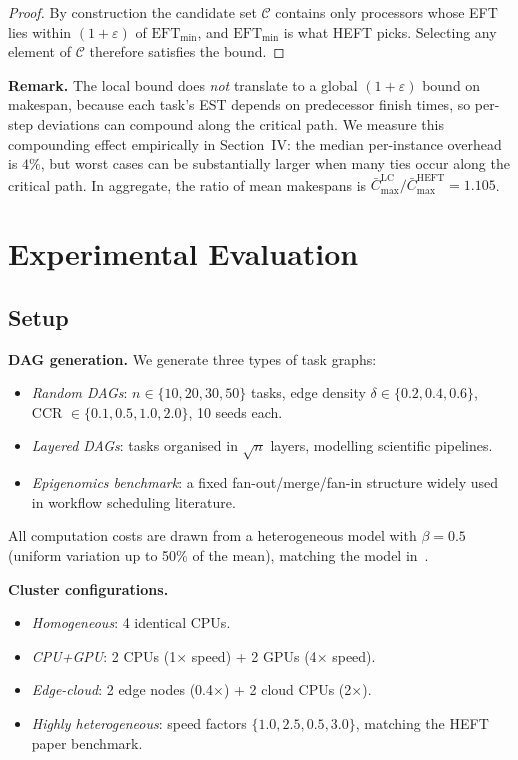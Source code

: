 \documentclass[conference]{IEEEtran}
\begin{document}
\begin{proof}
By construction the candidate set $\mathcal{C}$ contains only processors
whose EFT lies within $(1+\varepsilon)$ of $\text{EFT}_{\min}$, and
$\text{EFT}_{\min}$ is what HEFT picks. Selecting any element of
$\mathcal{C}$ therefore satisfies the bound.
\end{proof}

\textbf{Remark.} The local bound does \emph{not} translate to a global
$(1+\varepsilon)$ bound on makespan, because each task's EST depends on
predecessor finish times, so per-step deviations can compound along the
critical path. We measure this compounding effect empirically in
Section~IV: the median per-instance overhead is $4\%$, but worst
cases can be substantially larger when many ties occur along the
critical path. In aggregate, the ratio of mean makespans is
$\bar C^{\text{LC}}_{\max} / \bar C^{\text{HEFT}}_{\max} = 1.105$.

\section{Experimental Evaluation}

\subsection{Setup}

\textbf{DAG generation.} We generate three types of task graphs:
\begin{itemize}
  \item \textit{Random DAGs}: $n \in \{10, 20, 30, 50\}$ tasks, edge
        density $\delta \in \{0.2, 0.4, 0.6\}$,
        CCR $\in \{0.1, 0.5, 1.0, 2.0\}$, 10 seeds each.
  \item \textit{Layered DAGs}: tasks organised in $\sqrt{n}$ layers,
        modelling scientific pipelines.
  \item \textit{Epigenomics benchmark}: a fixed fan-out/merge/fan-in
        structure widely used in workflow scheduling literature.
\end{itemize}
All computation costs are drawn from a heterogeneous model with $\beta=0.5$
(uniform variation up to 50\% of the mean), matching the model
in~\cite{topcuoglu2002}.

\textbf{Cluster configurations.}
\begin{itemize}
  \item \textit{Homogeneous}: 4 identical CPUs.
  \item \textit{CPU+GPU}: 2 CPUs (1$\times$ speed) + 2 GPUs (4$\times$ speed).
  \item \textit{Edge-cloud}: 2 edge nodes (0.4$\times$) + 2 cloud CPUs (2$\times$).
  \item \textit{Highly heterogeneous}: speed factors $\{1.0, 2.5, 0.5, 3.0\}$,
        matching the HEFT paper benchmark.
\end{itemize}
\end{document}
